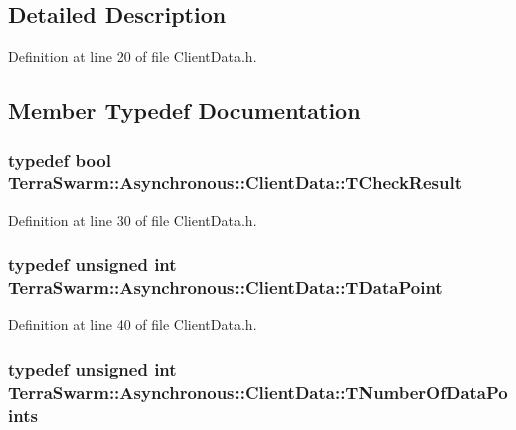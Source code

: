 \subsection{Detailed Description}


Definition at line 20 of file Client\-Data.\-h.



\subsection{Member Typedef Documentation}
\hypertarget{class_terra_swarm_1_1_asynchronous_1_1_client_data_a91575e9105c574792d5216d40f1c89de}{
\subsubsection[{T\-Check\-Result}]{\setlength{\rightskip}{0pt plus 5cm}typedef bool {\bf Terra\-Swarm\-::\-Asynchronous\-::\-Client\-Data\-::\-T\-Check\-Result}}}\label{class_terra_swarm_1_1_asynchronous_1_1_client_data_a91575e9105c574792d5216d40f1c89de}


Definition at line 30 of file Client\-Data.\-h.

\hypertarget{class_terra_swarm_1_1_asynchronous_1_1_client_data_ac733720fed15e940f991de44f1bb514e}{
\subsubsection[{T\-Data\-Point}]{\setlength{\rightskip}{0pt plus 5cm}typedef unsigned int {\bf Terra\-Swarm\-::\-Asynchronous\-::\-Client\-Data\-::\-T\-Data\-Point}}}\label{class_terra_swarm_1_1_asynchronous_1_1_client_data_ac733720fed15e940f991de44f1bb514e}


Definition at line 40 of file Client\-Data.\-h.

\hypertarget{class_terra_swarm_1_1_asynchronous_1_1_client_data_a690994afd0ba9b8eeb56ae679a5c64e8}{
\subsubsection[{T\-Number\-Of\-Data\-Points}]{\setlength{\rightskip}{0pt plus 5cm}typedef unsigned int {\bf Terra\-Swarm\-::\-Asynchronous\-::\-Client\-Data\-::\-T\-Number\-Of\-Data\-Points}}}\label{class_terra_swarm_1_1_asynchronous_1_1_client_data_a690994afd0ba9b8eeb56ae679a5c64e8}


